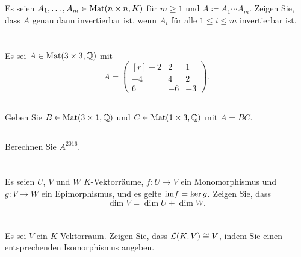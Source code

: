 \documentclass[a4paper,9pt]{extarticle}
\title{}
\author{Jendrik Stelzner}
\date{}
\begin{document}





\section{}
Es seien $A_1, \dotsc, A_m \in \mathrm{Mat}(n \times n, K)$ für $m \geq 1$ und $A \coloneqq A_1 \dotsm A_m$. Zeigen Sie, dass $A$ genau dann invertierbar ist, wenn $A_i$ für alle $1 \leq i \leq m$ invertierbar ist.





\section{}
Es sei $A \in \mathrm{Mat}(3 \times 3, \mathbb{Q})$ mit
\[
 A =
 \begin{pmatrix*}[r]
  -2 &  2 &  1 \\
  -4 &  4 &  2 \\
   6 & -6 & -3
 \end{pmatrix*}.
\]

\subsection{}
Geben Sie $B \in \mathrm{Mat}(3 \times 1, \mathbb{Q})$ und $C \in \mathrm{Mat}(1 \times 3, \mathbb{Q})$ mit $A = B C$.

\subsection{}
Berechnen Sie $A^{2016}$.





\section{}
Es seien $U$, $V$ und $W$ $K$-Vektorräume, $f \colon U \to V$ ein Monomorphismus und $g \colon V \to W$ ein Epimorphismus, und es gelte $\mathrm{im} f = \ker g$. Zeigen Sie, dass
\[
 \dim V = \dim U + \dim W.
\]





\section{}
Es sei $V$ ein $K$-Vektorraum. Zeigen Sie, dass $\mathcal{L}(K,V) \cong V$, indem Sie einen entsprechenden Isomorphismus angeben.
\end{document}

